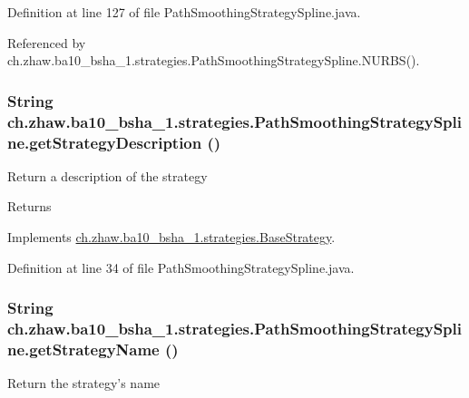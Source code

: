 Definition at line 127 of file PathSmoothingStrategySpline.java.

Referenced by ch.zhaw.ba10\_\-bsha\_\-1.strategies.PathSmoothingStrategySpline.NURBS().\hypertarget{classch_1_1zhaw_1_1ba10__bsha__1_1_1strategies_1_1PathSmoothingStrategySpline_a5ee7b3c0a4ad6cc7ae5aec7feeda34df}{
\subsubsection[{getStrategyDescription}]{\setlength{\rightskip}{0pt plus 5cm}String ch.zhaw.ba10\_\-bsha\_\-1.strategies.PathSmoothingStrategySpline.getStrategyDescription ()}}
\label{classch_1_1zhaw_1_1ba10__bsha__1_1_1strategies_1_1PathSmoothingStrategySpline_a5ee7b3c0a4ad6cc7ae5aec7feeda34df}
Return a description of the strategy

\begin{DoxyReturn}{Returns}

\end{DoxyReturn}


Implements \hyperlink{classch_1_1zhaw_1_1ba10__bsha__1_1_1strategies_1_1BaseStrategy_a75fdb36932ad701f6375cc1fe718056b}{ch.zhaw.ba10\_\-bsha\_\-1.strategies.BaseStrategy}.

Definition at line 34 of file PathSmoothingStrategySpline.java.\hypertarget{classch_1_1zhaw_1_1ba10__bsha__1_1_1strategies_1_1PathSmoothingStrategySpline_a1a91b60b6a706bc2365bc2ae9ab727af}{
\subsubsection[{getStrategyName}]{\setlength{\rightskip}{0pt plus 5cm}String ch.zhaw.ba10\_\-bsha\_\-1.strategies.PathSmoothingStrategySpline.getStrategyName ()}}
\label{classch_1_1zhaw_1_1ba10__bsha__1_1_1strategies_1_1PathSmoothingStrategySpline_a1a91b60b6a706bc2365bc2ae9ab727af}
Return the strategy's name

